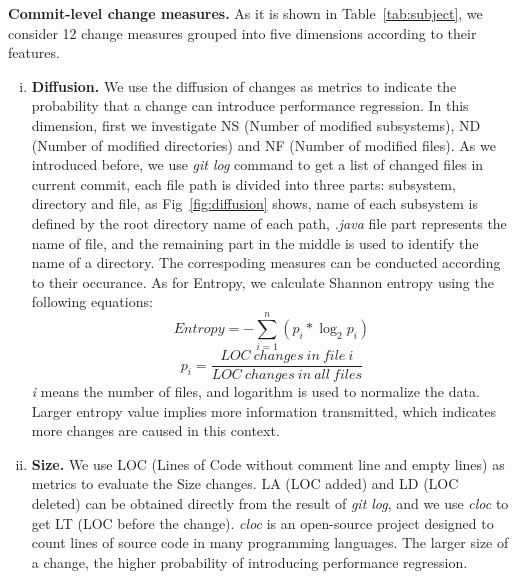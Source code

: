 \textbf{Commit-level change measures.} As it is shown in Table~\ref{tab:subject}, we consider 12 change measures grouped into five dimensions according to their features.
\begin{enumerate}[(i)]
	\item \noindent
	\textbf{Diffusion.} We use the diffusion of changes as metrics to indicate the probability that a change can introduce performance regression. In this dimension, first we investigate NS (Number of modified subsystems), ND (Number of modified directories) and NF (Number of modified files). As we introduced before, we use \textit{git log} command to get a list of changed files in current commit, each file path is divided into three parts: subsystem, directory and file, as Fig~\ref{fig:diffusion} shows, name of each subsystem is defined by the root directory name of each path, \textit{.java} file part represents the name of file, and the remaining part in the middle is used to identify the name of a directory. The correspoding measures can be conducted according to their occurance. As for Entropy, we calculate Shannon entropy using the following equations:
	\begin{equation}
	Entropy = - \sum_{i=1}^{n}\left (p_{i}\ast \log_2 p_{i} \right )
	\end{equation}
	\begin{equation}
	p_{i} =\frac{LOC\ changes\ in\ file\ i}{LOC\ changes\ in\ all\ files}
	\end{equation}
	\textit{i} means the number of files, and logarithm is used to normalize the data. Larger entropy value implies more information transmitted, which indicates more changes are caused in this context.
	
	\item \noindent
	\textbf{Size.}
	We use LOC (Lines of Code without comment line and empty lines) as metrics to evaluate the Size changes. LA (LOC added) and LD (LOC deleted) can be obtained directly from the result of \textit{git log}, and we use \textit{cloc} to get LT (LOC before the change). \textit{cloc} is an open-source project designed to count lines of source code in many programming languages. The larger size of a change,  the higher probability of introducing performance regression.
	

\end{enumerate}
